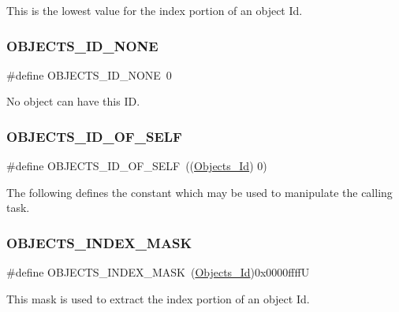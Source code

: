 This is the lowest value for the index portion of an object Id. \mbox{\label{group__RTEMSScoreObject_ga39c027c946ce38b5a77192c60130a1de}} 
\subsubsection{\texorpdfstring{OBJECTS\_ID\_NONE}{OBJECTS\_ID\_NONE}}
{\footnotesize\ttfamily \#define O\+B\+J\+E\+C\+T\+S\+\_\+\+I\+D\+\_\+\+N\+O\+NE~0}

No object can have this ID. \mbox{\label{group__RTEMSScoreObject_ga2454d6c322916168e6924f5ff26ab393}} 
\subsubsection{\texorpdfstring{OBJECTS\_ID\_OF\_SELF}{OBJECTS\_ID\_OF\_SELF}}
{\footnotesize\ttfamily \#define O\+B\+J\+E\+C\+T\+S\+\_\+\+I\+D\+\_\+\+O\+F\+\_\+\+S\+E\+LF~((\mbox{\hyperlink{group__RTEMSScoreObject_ga5821f52a51072941bdd603e542d0863e}{Objects\+\_\+\+Id}}) 0)}

The following defines the constant which may be used to manipulate the calling task. \mbox{\label{group__RTEMSScoreObject_gaadc4d76b75d97c07e1f16290a3c68f55}} 
\subsubsection{\texorpdfstring{OBJECTS\_INDEX\_MASK}{OBJECTS\_INDEX\_MASK}}
{\footnotesize\ttfamily \#define O\+B\+J\+E\+C\+T\+S\+\_\+\+I\+N\+D\+E\+X\+\_\+\+M\+A\+SK~(\mbox{\hyperlink{group__RTEMSScoreObject_ga5821f52a51072941bdd603e542d0863e}{Objects\+\_\+\+Id}})0x0000ffffU}

This mask is used to extract the index portion of an object Id. \mbox{\label{group__RTEMSScoreObject_ga862ae375ea2befa61f83ce6c1d1b5802}} 
